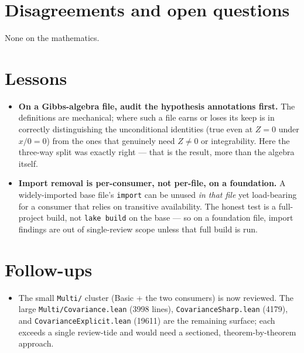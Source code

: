 \documentclass[11pt]{article}
\begin{document}
\section{Disagreements and open questions}
None on the mathematics.

\section{Lessons}
\begin{itemize}[noitemsep]
  \item \textbf{On a Gibbs-algebra file, audit the hypothesis annotations first.} The definitions are
    mechanical; where such a file earns or loses its keep is in correctly distinguishing the unconditional
    identities (true even at $Z=0$ under $x/0=0$) from the ones that genuinely need $Z\ne0$ or integrability.
    Here the three-way split was exactly right --- that is the result, more than the algebra itself.
  \item \textbf{Import removal is per-consumer, not per-file, on a foundation.} A widely-imported base file's
    \texttt{import} can be unused \emph{in that file} yet load-bearing for a consumer that relies on
    transitive availability. The honest test is a full-project build, not \texttt{lake build} on the base ---
    so on a foundation file, import findings are out of single-review scope unless that full build is run.
\end{itemize}

\section{Follow-ups}
\begin{itemize}[noitemsep]
  \item The small \texttt{Multi/} cluster (Basic + the two consumers) is now reviewed. The large
    \texttt{Multi/Covariance.lean} (3998 lines), \texttt{CovarianceSharp.lean} (4179), and
    \texttt{CovarianceExplicit.lean} (19611) are the remaining surface; each exceeds a single review-tide and
    would need a sectioned, theorem-by-theorem approach.
\end{itemize}
\end{document}
